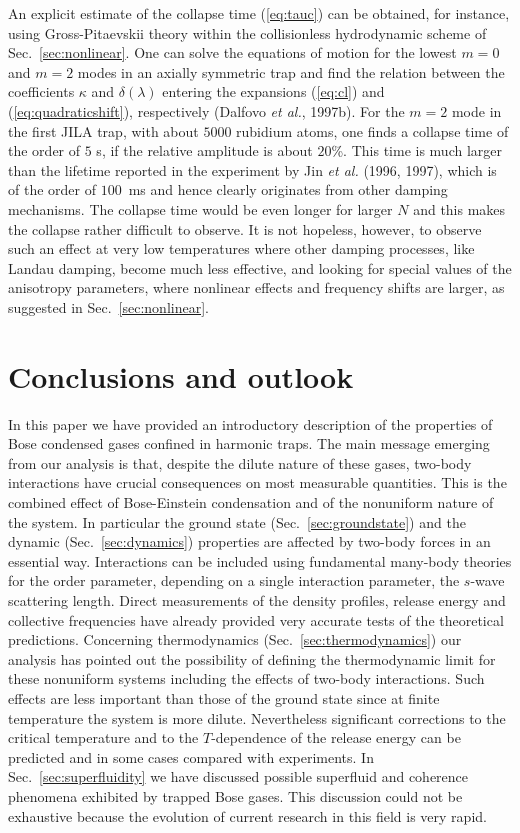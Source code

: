 An explicit estimate of the collapse time (\ref{eq:tauc}) can be obtained, 
for instance, using Gross-Pitaevskii theory  within the collisionless 
hydrodynamic scheme of Sec.~\ref{sec:nonlinear}. One can solve the
equations of motion for the lowest $m=0$ and $m=2$ modes in an
axially symmetric trap and find the relation between the coefficients
$\kappa$ and $\delta(\lambda)$ entering the expansions (\ref{eq:cl})
and (\ref{eq:quadraticshift}), respectively (Dalfovo {\it et al.},
1997b).  For the $m=2$ mode in the first JILA trap, with about $5000$
rubidium atoms, one finds a collapse time of the order of $5$ s, if the
relative amplitude is about $20$\%.  This time is much larger than the
lifetime reported in the experiment by Jin {\it et al.} (1996, 1997), 
which is of the order of $100$~ms and hence clearly originates from
other damping mechanisms. The collapse time
would be even longer for larger $N$ and this makes the collapse
rather difficult to observe. It is not hopeless, however, to observe
such an effect at very low temperatures where other
damping processes, like Landau damping, become much less
effective, and looking for special values of the anisotropy parameters,
where nonlinear effects and frequency shifts are larger, as suggested in
Sec.~\ref{sec:nonlinear}. 


\section{Conclusions and outlook}
\label{sec:conclusions}

In this paper we have provided an introductory description of the 
properties of Bose condensed gases confined in harmonic traps. The 
main message emerging from our analysis is that, despite the dilute  
nature of these gases, two-body interactions have crucial consequences
on most measurable quantities. This is the combined effect of
Bose-Einstein condensation and of the nonuniform nature  of the
system. In particular the ground state  (Sec.~\ref{sec:groundstate})
and the dynamic  (Sec.~\ref{sec:dynamics}) properties  are affected by
two-body forces in an essential  way. Interactions can be
included using fundamental many-body theories for the
order parameter, depending on a single interaction parameter,
the $s$-wave scattering length. Direct measurements of the density
profiles,  release energy and collective frequencies
have already provided very accurate tests of the theoretical predictions.
Concerning thermodynamics  (Sec.~\ref{sec:thermodynamics}) our analysis
has pointed out the possibility of defining the thermodynamic limit
for these nonuniform systems including the effects of two-body
interactions. Such effects are less important than those 
of the ground state since at finite temperature the system
is more dilute. Nevertheless significant corrections to
the critical temperature and to the $T$-dependence of the
release energy can be predicted and in some cases compared with
experiments.  In Sec.~\ref{sec:superfluidity} we have discussed 
possible superfluid and coherence phenomena exhibited by trapped
Bose gases. This discussion could not be exhaustive
because the evolution of current research in this field
is very rapid.

